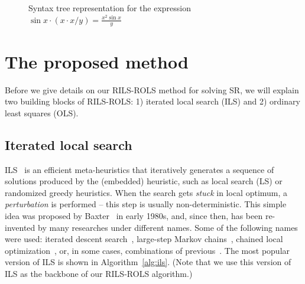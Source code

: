 \documentclass[a4paper,12pt]{elsarticle}
\begin{document}
	\begin{figure}[!ht]
		\centering
		
		\caption{Syntax tree representation for the expression $\sin{x} \cdot   ( x \cdot  x / y  )  = \frac{x^2 \sin x }{y}$}
		\label{fig:syntax-tree-example}
	\end{figure}
	
	
	
	\section{The proposed method}\label{sec:rils}
 
	Before we give details on our \textsc{RILS}-\textsc{ROLS}  method for solving SR, we will explain two building blocks of \textsc{RILS-ROLS}: 1) iterated local search (ILS) and 2) ordinary least squares (OLS). 
	
	\subsection{Iterated local search}
	ILS~\cite{lourencco2003iterated} is an efficient meta-heuristics that iteratively generates a sequence of solutions produced by the (embedded) heuristic, such as local search (LS) or randomized greedy heuristics. When the search gets \emph{stuck} in local optimum, a \emph{perturbation} is performed -- this step is usually non-deterministic. This simple idea was proposed by Baxter~\cite{baxter1981local} in early 1980s, and, since then, has been  re-invented by many researches under different names. Some of the following names were used: iterated descent search~\cite{baum1998iterated}, large-step
	Markov chains~\cite{martin1991large}, chained local optimization~\cite{martin1996combining}, or, in some cases, combinations of previous~\cite{applegate2003chained}. The most popular version of ILS is shown in Algorithm~\ref{alg:ils}. (Note that we use this version of ILS as the backbone of our \textsc{RILS}-\textsc{ROLS} algorithm.)
	
\end{document}
